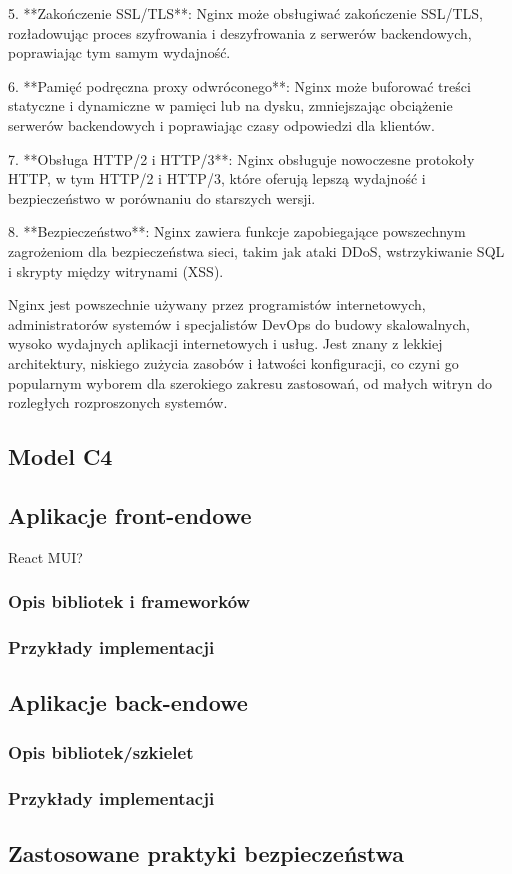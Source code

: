 5. **Zakończenie SSL/TLS**: Nginx może obsługiwać zakończenie SSL/TLS, rozładowując proces szyfrowania i deszyfrowania z serwerów backendowych, poprawiając tym samym wydajność.

6. **Pamięć podręczna proxy odwróconego**: Nginx może buforować treści statyczne i dynamiczne w pamięci lub na dysku, zmniejszając obciążenie serwerów backendowych i poprawiając czasy odpowiedzi dla klientów.

7. **Obsługa HTTP/2 i HTTP/3**: Nginx obsługuje nowoczesne protokoły HTTP, w tym HTTP/2 i HTTP/3, które oferują lepszą wydajność i bezpieczeństwo w porównaniu do starszych wersji.

8. **Bezpieczeństwo**: Nginx zawiera funkcje zapobiegające powszechnym zagrożeniom dla bezpieczeństwa sieci, takim jak ataki DDoS, wstrzykiwanie SQL i skrypty między witrynami (XSS).

Nginx jest powszechnie używany przez programistów internetowych, administratorów systemów i specjalistów DevOps do budowy skalowalnych, wysoko wydajnych aplikacji internetowych i usług. Jest znany z lekkiej architektury, niskiego zużycia zasobów i łatwości konfiguracji, co czyni go popularnym wyborem dla szerokiego zakresu zastosowań, od małych witryn do rozległych rozproszonych systemów.

\subsection{Model C4}

\subsection{Aplikacje front-endowe}
React MUI?

\subsubsection{Opis bibliotek i frameworków}

\subsubsection{Przykłady implementacji}

\subsection{Aplikacje back-endowe}

\subsubsection{Opis bibliotek/szkielet}

\subsubsection{Przykłady implementacji}

\subsection{Zastosowane praktyki bezpieczeństwa}